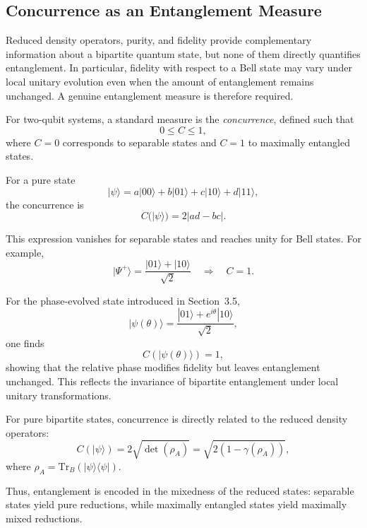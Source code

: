 \documentclass[a4paper]{article}
\begin{document}

\subsection{Concurrence as an Entanglement Measure}

Reduced density operators, purity, and fidelity provide complementary information about a bipartite quantum state, but none of them directly quantifies entanglement. In particular, fidelity with respect to a Bell state may vary under local unitary evolution even when the amount of entanglement remains unchanged. A genuine entanglement measure is therefore required.

\medskip

For two-qubit systems, a standard measure is the \emph{concurrence}, defined such that
\[
0 \le C \le 1,
\]
where \(C=0\) corresponds to separable states and \(C=1\) to maximally entangled states.

\medskip

For a pure state
\[
|\psi\rangle = a|00\rangle + b|01\rangle + c|10\rangle + d|11\rangle,
\]
the concurrence is
\[
C(|\psi\rangle) = 2|ad - bc|.
\]

This expression vanishes for separable states and reaches unity for Bell states. For example,
\[
|\Psi^+\rangle = \frac{|01\rangle + |10\rangle}{\sqrt{2}}
\quad \Rightarrow \quad C = 1.
\]

\medskip

For the phase-evolved state introduced in Section~3.5,
\[
|\psi(\theta)\rangle
=
\frac{|01\rangle + e^{i\theta}|10\rangle}{\sqrt{2}},
\]
one finds
\[
C(|\psi(\theta)\rangle) = 1,
\]
showing that the relative phase modifies fidelity but leaves entanglement unchanged. This reflects the invariance of bipartite entanglement under local unitary transformations.

\medskip

For pure bipartite states, concurrence is directly related to the reduced density operators:
\[
C(|\psi\rangle)
=
2\sqrt{\det(\rho_A)}
=
\sqrt{2\left(1-\gamma(\rho_A)\right)},
\]
where \( \rho_A = \mathrm{Tr}_B(|\psi\rangle\langle\psi|) \).

Thus, entanglement is encoded in the mixedness of the reduced states: separable states yield pure reductions, while maximally entangled states yield maximally mixed reductions.
\end{document}
